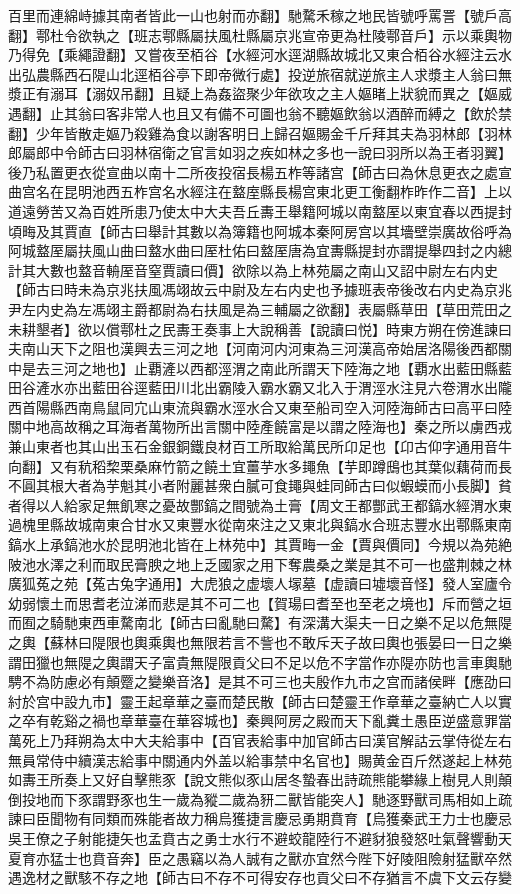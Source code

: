 百里而連綿峙據其南者皆此一山也射而亦翻】馳騖禾稼之地民皆號呼罵詈【號戶高翻】鄠杜令欲執之【班志鄠縣屬扶風杜縣屬京兆宣帝更為杜陵鄠音戶】示以乘輿物乃得免【乘繩證翻】又嘗夜至栢谷【水經河水逕湖縣故城北又東合栢谷水經注云水出弘農縣西石隄山北逕栢谷亭下即帝微行處】投逆旅宿就逆旅主人求漿主人翁曰無漿正有溺耳【溺奴吊翻】且疑上為姦盜聚少年欲攻之主人嫗睹上狀貌而異之【嫗威遇翻】止其翁曰客非常人也且又有備不可圖也翁不聽嫗飲翁以酒醉而縛之【飲於禁翻】少年皆散走嫗乃殺雞為食以謝客明日上歸召嫗賜金千斤拜其夫為羽林郎【羽林郎屬郎中令師古曰羽林宿衛之官言如羽之疾如林之多也一說曰羽所以為王者羽翼】後乃私置更衣從宣曲以南十二所夜投宿長楊五柞等諸宫【師古曰為休息更衣之處宣曲宫名在昆明池西五柞宫名水經注在盩庢縣長楊宫東北更工衡翻柞昨作二音】上以道遠勞苦又為百姓所患乃使太中大夫吾丘夀王舉籍阿城以南盩厔以東宜春以西提封頃畮及其賈直【師古曰舉計其數以為簿籍也阿城本秦阿房宫以其墻壁崇廣故俗呼為阿城盩厔屬扶風山曲曰盩水曲曰厔杜佑曰盩厔唐為宜夀縣提封亦謂提舉四封之内總計其大數也盩音輈厔音窒賈讀曰價】欲除以為上林苑屬之南山又詔中尉左右内史【師古曰時未為京兆扶風馮翊故云中尉及左右内史也予據班表帝後改右内史為京兆尹左内史為左馮翊主爵都尉為右扶風是為三輔屬之欲翻】表屬縣草田【草田荒田之未耕墾者】欲以償鄠杜之民夀王奏事上大說稱善【說讀曰悦】時東方朔在傍進諫曰夫南山天下之阻也漢興去三河之地【河南河内河東為三河漢高帝始居洛陽後西都關中是去三河之地也】止覇滻以西都涇渭之南此所謂天下陸海之地【覇水出藍田縣藍田谷滻水亦出藍田谷逕藍田川北出霸陵入霸水霸又北入于渭涇水注見六卷渭水出隴西首陽縣西南鳥鼠同宂山東流與霸水涇水合又東至船司空入河陸海師古曰高平曰陸關中地高故稱之耳海者萬物所出言關中陸產饒富是以謂之陸海也】秦之所以虜西戎兼山東者也其山出玉石金銀銅鐵良材百工所取給萬民所卬足也【卬古仰字通用音牛向翻】又有秔稻棃栗桑麻竹箭之饒土宜薑芋水多䵷魚【芋即蹲䲭也其葉似藕荷而長不圓其根大者為芋魁其小者附麗甚衆白膩可食䵷與蛙同師古曰似蝦蟆而小長脚】貧者得以人給家足無飢寒之憂故酆鎬之間號為土膏【周文王都酆武王都鎬水經渭水東過槐里縣故城南東合甘水又東豐水從南來注之又東北與鎬水合班志豐水出鄠縣東南鎬水上承鎬池水於昆明池北皆在上林苑中】其賈畮一金【賈與價同】今規以為苑絶陂池水澤之利而取民膏腴之地上乏國家之用下奪農桑之業是其不可一也盛荆棘之林廣狐菟之苑【菟古兔字通用】大虎狼之虚壞人塜墓【虚讀曰墟壞音怪】發人室廬令幼弱懷土而思耆老泣涕而悲是其不可二也【賀瑒曰耆至也至老之境也】斥而營之垣而囿之騎馳東西車騖南北【師古曰亂馳曰騖】有深溝大渠夫一日之樂不足以危無隄之輿【蘇林曰隄限也輿乘輿也無限若言不訾也不敢斥天子故曰輿也張晏曰一日之樂謂田獵也無隄之輿謂天子富貴無隄限貢父曰不足以危不字當作亦隄亦防也言車輿馳騁不為防慮必有顛蹷之變樂音洛】是其不可三也夫殷作九市之宫而諸侯畔【應劭曰紂於宫中設九市】靈王起章華之臺而楚民散【師古曰楚靈王作章華之臺納亡人以實之卒有乾谿之禍也章華臺在華容城也】秦興阿房之殿而天下亂糞土愚臣逆盛意罪當萬死上乃拜朔為太中大夫給事中【百官表給事中加官師古曰漢官解詁云掌侍從左右無員常侍中續漢志給事中關通内外盖以給事禁中名官也】賜黄金百斤然遂起上林苑如夀王所奏上又好自擊熊豕【說文熊似豕山居冬蟄春出詩疏熊能攀緣上樹見人則顛倒投地而下豕謂野豕也生一歲為豵二歲為豜二獸皆能突人】馳逐野獸司馬相如上疏諫曰臣聞物有同類而殊能者故力稱烏獲捷言慶忌勇期賁育【烏獲秦武王力士也慶忌吳王僚之子射能捷矢也孟賁古之勇士水行不避蛟龍陸行不避豺狼發怒吐氣聲響動天夏育亦猛士也賁音奔】臣之愚竊以為人誠有之獸亦宜然今陛下好陵阻險射猛獸卒然遇逸材之獸駭不存之地【師古曰不存不可得安存也貢父曰不存猶言不虞下文云存變